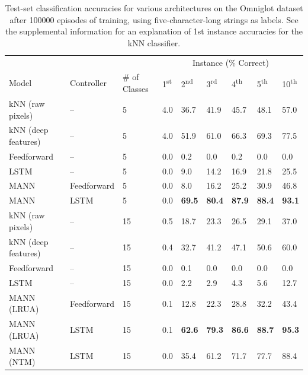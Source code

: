 \documentclass{article}
\begin{document}
\begin{table}[t]
\caption{Test-set classification accuracies for various architectures on the Omniglot dataset after 100000 episodes of training, using five-character-long strings as labels. See the supplemental information for an explanation of 1st instance accuracies for the kNN classifier.}
\label{omniglot-string-table}
\vskip 0.15in
\begin{center}
\begin{small}
\begin{sc}
\begin{tabular}{llp{20mm}|p{8mm}p{8mm}p{8mm}p{8mm}p{8mm}p{8mm}}
\hline
& & &  \multicolumn{6}{c}{Instance (\% Correct)} \\
Model & Controller &  \# of Classes & 1\textsuperscript{st} & 2\textsuperscript{nd} & 3\textsuperscript{rd} & 4\textsuperscript{th} & 5\textsuperscript{th} & 10\textsuperscript{th} \\
\hline
\abovespace
kNN (raw pixels) &   -- & 5  & 4.0 & 36.7 & 41.9 & 45.7 & 48.1 & 57.0 \\
kNN (deep features) & --          & 5  & 4.0 & 51.9 & 61.0 & 66.3 & 69.3 & 77.5 \\
Feedforward &   --           & 5  & 0.0     & 0.2             & 0.0           & 0.2           & 0.0         & 0.0\\
LSTM        &   --           & 5  & 0.0     & 9.0             & 14.2          & 16.9          & 21.8        & 25.5\\
MANN        &   Feedforward  & 5  & 0.0     & 8.0             & 16.2          & 25.2          & 30.9          & 46.8  \\
MANN        &   LSTM         & 5  & 0.0     & \textbf{69.5}   & \textbf{80.4} & \textbf{87.9} & \textbf{88.4} & \textbf{93.1}  \\
\hline
\abovespace
kNN (raw pixels) &   --           & 15 & 0.5 & 18.7 & 23.3 & 26.5 & 29.1 & 37.0 \\
kNN (deep features) &   --           & 15 & 0.4 & 32.7 & 41.2 & 47.1 & 50.6 & 60.0  \\
Feedforward &   --           & 15 & 0.0     & 0.1           & 0.0           & 0.0           & 0.0             & 0.0  \\
LSTM        &   --           & 15 & 0.0     & 2.2           & 2.9           & 4.3           & 5.6             & 12.7  \\
MANN (LRUA) &   Feedforward  & 15 & 0.1     & 12.8          & 22.3          & 28.8          & 32.2          & 43.4  \\
MANN (LRUA) &   LSTM         & 15 & 0.1     & \textbf{62.6} & \textbf{79.3} & \textbf{86.6} & \textbf{88.7} & \textbf{95.3}  \\
MANN (NTM)&LSTM         & 15 & 0.0     & 35.4            & 61.2          & 71.7          & 77.7          & 88.4 \\
\hline
\end{tabular}
\end{sc}
\end{small}
\end{center}
\vskip -0.1in
\end{table}
\end{document}
